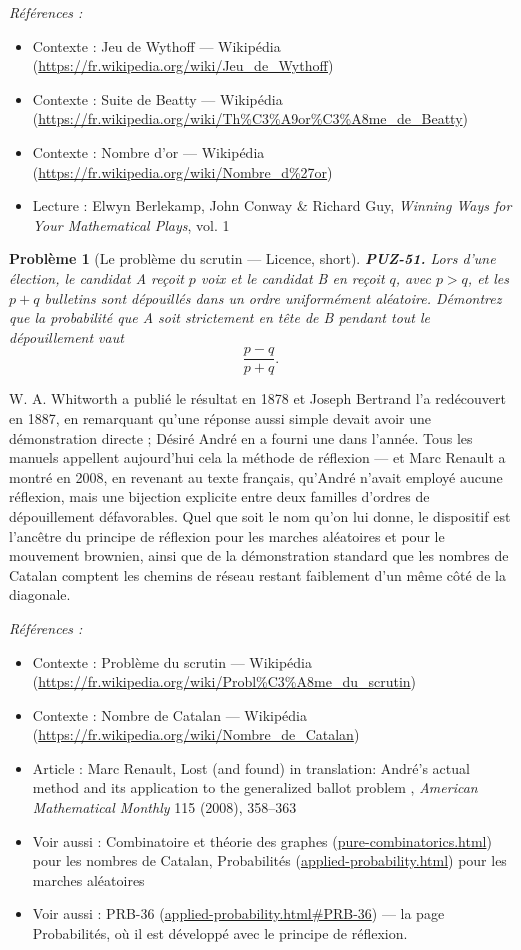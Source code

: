 \documentclass[11pt]{article}
\newtheorem{problem}{Problème}
\newenvironment{refs}{\par\small\noindent\emph{Références :}\begin{itemize}\setlength\itemsep{0pt}}{\end{itemize}\normalsize}
\begin{document}
\begin{refs}
\item Contexte : Jeu de Wythoff --- Wikipédia (\url{https://fr.wikipedia.org/wiki/Jeu_de_Wythoff})
\item Contexte : Suite de Beatty --- Wikipédia (\url{https://fr.wikipedia.org/wiki/Th%C3%A9or%C3%A8me_de_Beatty})
\item Contexte : Nombre d'or --- Wikipédia (\url{https://fr.wikipedia.org/wiki/Nombre_d%27or})
\item Lecture : Elwyn Berlekamp, John Conway \& Richard Guy, \textit{Winning Ways for Your Mathematical Plays}, vol. 1
\end{refs}

\bigskip

\begin{problem}[{Le problème du scrutin --- Licence, short}]
\textbf{PUZ-51.} Lors d'une élection, le candidat A reçoit $ p $ voix
et le candidat B en reçoit $ q $, avec $ p > q $, et les $ p + q $ bulletins sont
dépouillés dans un ordre uniformément aléatoire. Démontrez que la probabilité que A soit
strictement en tête de B pendant tout le dépouillement vaut
\[ \frac{p-q}{p+q} . \]
\end{problem}

\noindent W. A. Whitworth a publié le résultat en 1878 et Joseph Bertrand l'a
redécouvert en 1887, en remarquant qu'une réponse aussi simple devait avoir une démonstration
directe ; Désiré André en a fourni une dans l'année. Tous les manuels appellent aujourd'hui
cela la méthode de réflexion --- et Marc Renault a montré en 2008, en revenant au texte
français, qu'André n'avait employé aucune réflexion, mais une bijection explicite entre deux
familles d'ordres de dépouillement défavorables. Quel que soit le nom qu'on lui donne, le
dispositif est l'ancêtre du principe de réflexion pour les marches aléatoires et pour le
mouvement brownien, ainsi que de la démonstration standard que les nombres de Catalan
comptent les chemins de réseau restant faiblement d'un même côté de la diagonale.

\begin{refs}
\item Contexte : Problème du scrutin --- Wikipédia (\url{https://fr.wikipedia.org/wiki/Probl%C3%A8me_du_scrutin})
\item Contexte : Nombre de Catalan --- Wikipédia (\url{https://fr.wikipedia.org/wiki/Nombre_de_Catalan})
\item Article : Marc Renault, \og{} Lost (and found) in translation: André's actual method and its application to the generalized ballot problem \fg{}, \textit{American Mathematical Monthly} 115 (2008), 358--363
\item Voir aussi : Combinatoire et théorie des graphes (\url{pure-combinatorics.html}) pour les nombres de Catalan, Probabilités (\url{applied-probability.html}) pour les marches aléatoires
\item Voir aussi : PRB-36 (\url{applied-probability.html#PRB-36}) --- la page Probabilités, où il est développé avec le principe de réflexion.
\end{refs}
\end{document}
